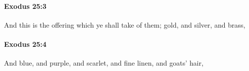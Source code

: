 		\paragraph{Exodus 25:3} %
			\label{EXODUS-25-3}

			And this is the offering which ye shall take of them; gold, and silver, and brass,


		\paragraph{Exodus 25:4} %
			\label{EXODUS-25-4}

			And blue, and purple, and scarlet, and fine linen, and goats' hair,


